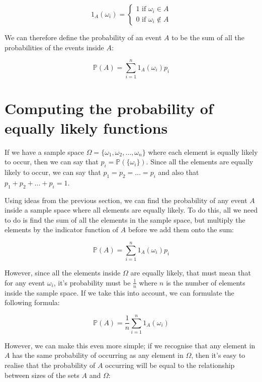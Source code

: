 \begin{dmath*}
	1_A(\omega_i) = \begin{cases} 
						1\textrm{ if }\omega_i \in A\\
						0\textrm{ if }\omega_i \not\in A
					\end{cases}
\end{dmath*}

We can therefore define the probability of an event $A$ to be the sum of all the
probabilities of the events inside $A$:

\begin{dmath*}
	\mathbb{P}(A) = \sum\limits_{i=1}^n1_A(\omega_i)p_i
\end{dmath*}


\section{Computing the probability of equally likely functions}

If we have a sample space $\Omega = \{ \omega_1, \omega_2, \dots, \omega_n \}$
where each element is equally likely to occur, then we can say that $p_i =
\mathbb{P}(\{\omega_i\})$. Since all the elements are equally likely to occur,
we can say that $p_1 = p_2 = \dots = p_i$ and also that $p_1 + p_2 + \dots + p_i
= 1$.

Using ideas from the previous section, we can find the probability of any event
$A$ inside a sample space where all elements are equally likely. To do this, all
we need to do is find the sum of all the elements in the sample space, but
multiply the elements by the indicator function of $A$ before we add them onto
the sum:

\begin{dmath*}
	\mathbb{P}(A) = \sum\limits_{i=1}^{n} 1_A(\omega_i)p_i
\end{dmath*}

However, since all the elements inside $\Omega$ are equally likely, that must
mean that for any event $\omega_i$, it's probability must be $\frac{1}{n}$ where
$n$ is the number of elements inside the sample space. If we take this into
account, we can formulate the following formula:

\begin{dmath*}
	\mathbb{P}(A) = \frac{1}{n}\sum\limits_{i=1}^{n} 1_A(\omega_i)
\end{dmath*}


However, we can make this even more simple; if we recognise that any element in
$A$ has the same probability of occurring as any element in $\Omega$, then it's
easy to realise that the probability of $A$ occurring will be equal to the
relationship between sizes of the sets $A$ and $\Omega$:

